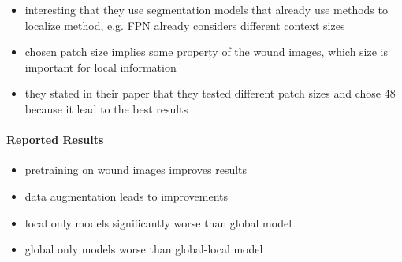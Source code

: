 \begin{itemize}
	\item interesting that they use segmentation models that already use methods to localize method, e.g. FPN already considers different context sizes
	\item chosen patch size implies some property of the wound images, which size is important for local information
	\item they stated in their paper that they tested different patch sizes and chose 48 because it lead to the best results
\end{itemize}


\paragraph{Reported Results}

\begin{itemize}
	\item pretraining on wound images improves results
	\item data augmentation leads to improvements
	\item local only models significantly worse than global model
	\item global only models worse than global-local model
\end{itemize}



